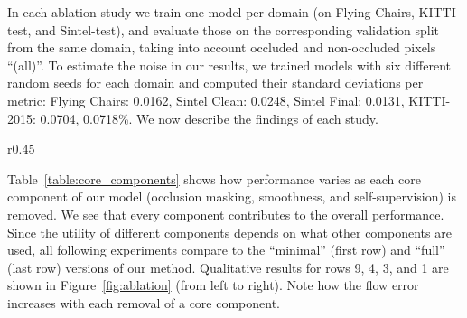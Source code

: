 \documentclass[runningheads]{llncs}
\begin{document}
In each ablation study we train one model per domain (on Flying Chairs, KITTI-test, and Sintel-test), and evaluate those on the corresponding validation split from the same domain, taking into account occluded and non-occluded pixels ``(all)''. To estimate the noise in our results, we trained models with six different random seeds for each domain and computed their standard deviations per metric: Flying Chairs: 0.0162, Sintel Clean: 0.0248, Sintel Final: 0.0131, KITTI-2015: 0.0704, 0.0718\%. We now describe the findings of each study.

\begin{wraptable}{r}{0.45\columnwidth}
     \vspace{-10pt}
    \caption{Core components: OM: occlusion masking, SM: smoothness, SS: self-supervision; ``div.'': divergence}
    \label{table:core_components}
\end{wraptable}

 Table~\ref{table:core_components} shows how performance varies as each core component of our model (occlusion masking, smoothness, and self-supervision) is removed. We see that every component contributes to the overall performance. Since the utility of different components depends on what other components are used, all following experiments compare to the ``minimal'' (first row) and ``full'' (last row) versions of our method. Qualitative results for rows 9, 4, 3, and 1 are shown in Figure~\ref{fig:ablation} (from left to right). Note how the flow error  increases with each removal of a core component.
\end{document}

